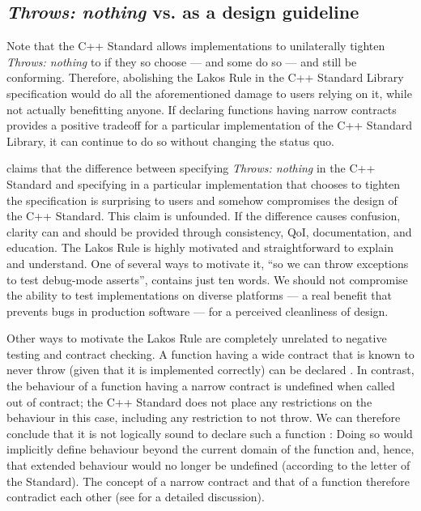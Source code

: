 \subsection{\emph{Throws: nothing} vs.  as a design guideline}

Note that the C++ Standard allows implementations to unilaterally tighten \emph{Throws: nothing} to  if they so choose --- and some do so --- and still be conforming. Therefore, abolishing the Lakos Rule in the C++ Standard Library specification would do all the aforementioned damage to users relying on it, while not actually benefitting anyone. If declaring functions having narrow contracts  provides a positive tradeoff for a particular implementation of the C++ Standard Library, it can continue to do so without changing the status quo.

\cite{P1656R2} claims that the difference between specifying \emph{Throws: nothing} in the C++ Standard and specifying  in a particular implementation that chooses to tighten the specification is surprising to users and somehow compromises the design of the C++ Standard. This claim is unfounded. If the difference causes confusion, clarity can and should be provided through consistency, QoI, documentation, and education. The Lakos Rule is highly motivated and straightforward to explain and understand. One of several ways to motivate it,  ``so we can throw exceptions to test debug-mode asserts'', contains just ten words. We should not compromise the ability to test implementations on diverse platforms --- a real benefit that prevents bugs in production software --- for a perceived cleanliness of design.

Other ways to motivate the Lakos Rule are completely unrelated to negative testing and contract checking. A function having a wide contract that is known to never throw (given that it is implemented correctly) can be declared . In contrast, the behaviour of a function having a narrow contract is undefined when called out of contract; the C++ Standard does not place any restrictions on the behaviour in this case, including any restriction to not throw. We can therefore conclude that it is not logically sound to declare such a function : Doing so would implicitly define behaviour beyond the current domain of the function and, hence, that extended behaviour would no longer be undefined (according to the letter of the Standard). The concept of a narrow contract and that of a  function therefore contradict each other (see \cite{P2861R0} for a detailed discussion).

